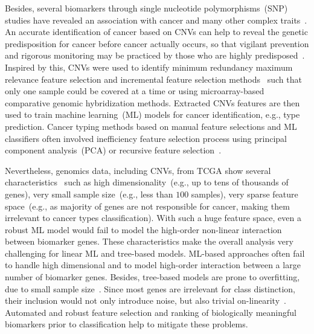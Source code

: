 \hspace*{3.5mm} Besides, several biomarkers through single nucleotide polymorphisms~(SNP) studies have revealed an association with cancer and many other complex traits~\cite{almal2012implications}. An accurate identification of cancer based on CNVs can help to reveal the genetic predisposition for cancer before cancer actually occurs, so that vigilant prevention and rigorous monitoring may be practiced by those who are highly predisposed~\cite{19Cruz}. Inspired by this, CNVs were used to identify minimum redundancy maximum relevance feature selection and incremental feature selection methods~\cite{zhang2016classification} such that only one sample could be covered at a time or using microarray-based comparative genomic hybridization methods. Extracted CNVs features are then used to train machine learning~(ML) models for cancer identification, e.g., type prediction. Cancer typing methods based on manual feature selections and ML classifiers often involved inefficiency feature selection process using principal component analysis~(PCA) or recursive feature selection~\cite{malekpour2018mseq}. %

\hspace*{3.5mm} Nevertheless, genomics data, including CNVs, from TCGA show several characteristics~\cite{lu2003cancer} such as high dimensionality~(e.g., up to tens of thousands of genes), very small sample size~(e.g., less than $100$ samples), very sparse feature space~(e.g., as majority of genes are not responsible for cancer, making them irrelevant to cancer types classification). With such a huge feature space, even a robust ML model would fail to model the high-order non-linear interaction between biomarker genes. These characteristics make the overall analysis very challenging for  linear ML and tree-based models. ML-based approaches often fail to handle high dimensional and to model high-order interaction between a large number of biomarker genes. Besides, tree-based models are prone to overfitting, due to small sample size~\cite{lu2003cancer}. Since most genes are irrelevant for class distinction, their inclusion would not only introduce noise, but also trivial on-linearity~\cite{lu2003cancer}. Automated and robust feature selection and ranking of biologically meaningful biomarkers prior to classification help to mitigate these problems. 

